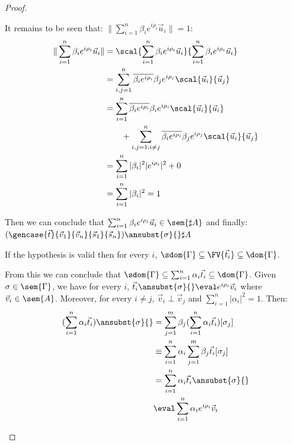 \begin{proof}
\begin{description}
    It remains to be seen that: $\|\sum_{i=1}^{n}\beta_i e^{i\rho_i} \vec{u}_{i}\|=1$:
    \begin{align*}
        \|\sum_{i=1}^{n}\beta_i e^{i\rho_i} \vec{u}_{i}\| &= \scal{\sum_{i=1}^{n}\beta_i e^{i\rho_i} \vec{u}_{i}}{\sum_{i=1}^{n}\beta_i e^{i\rho_i} \vec{u}_{i}}\\
        &= \sum_{i,j=1}^{n}\overline{\beta_i e^{i\rho_i}}\beta_j e^{i\rho_j} \scal{\vec{u}_{i}}{\vec{u}_{j}}\\
        &= \sum_{i=1}^{n}\overline{\beta_i e^{i\rho_i}}\beta_i e^{i\rho_i} \scal{\vec{u}_{i}}{\vec{u}_{i}}\\
        &\qquad + \sum_{i,j=1; i\neq j}^{n}\overline{\beta_i e^{i\rho_i}}\beta_j e^{i\rho_j} \scal{\vec{u}_{i}}{\vec{u}_{j}}\\
        &= \sum_{i=1}^{n}|\beta_i|^2 |e^{i\rho_i}|^2  + 0\\
        &= \sum_{i=1}^{n}|\beta_i|^2 = 1
    \end{align*}

    Then we can conclude that $\sum_{i=1}^{n}\beta_i e^{i\rho_i}\vec{u}_{i}\in\sem{\sharp A}$ and finally: $(\gencase{\vec{t}}{\vec{v}_{1}}{\vec{v}_{n}}{\vec{s}_{1}}{\vec{s}_{n}})\ansubst{\sigma}{}\real\sharp A $
  
    \item[Sum] If the hypothesis is valid then for every $i$, $\sdom{\Gamma}\subseteq\FV{\vec{t}_{i}}\subseteq\dom{\Gamma}$.
    
    From this we can conclude that $\sdom{\Gamma}\subseteq\sum_{i=1}^{n}\alpha_i \vec{t}_{i}\subseteq\dom{\Gamma}$. Given $\sigma\in\sem{\Gamma}$, we have for every $i$, $\vec{t}_{i}\ansubst{\sigma}{}\eval e^{i\rho_i} \vec{v}_{i}$ where $\vec{v}_{i}\in\sem{A}$. Moreover, for every $i\neq j$, $\vec{v}_{i}\perp\vec{v}_{j}$ and $\sum_{i=1}^{n}|\alpha_i|^2=1$. Then:
    \begin{align*}
    (\sum_{i=1}^{n}\alpha_i\vec{t}_{i})\ansubst{\sigma}{} 
    &= \sum_{j=1}^{m}\beta_j(\sum_{i=1}^{n}\alpha_i \vec{t}_{i})[\sigma_j]\\
    &\equiv \sum_{i=1}^{n} \alpha_i \sum_{j=1}^{m} \beta_j \vec{t}_{i}[\sigma_j]\\
    &=\sum_{i=1}^{n} \alpha_i \vec{t}_{i}\ansubst{\sigma}{}\\
    &\eval \sum_{i=1}^{n} \alpha_i e^{i\rho_i} \vec{v}_{i}\\
    \end{align*}


\end{description}
\end{proof}
